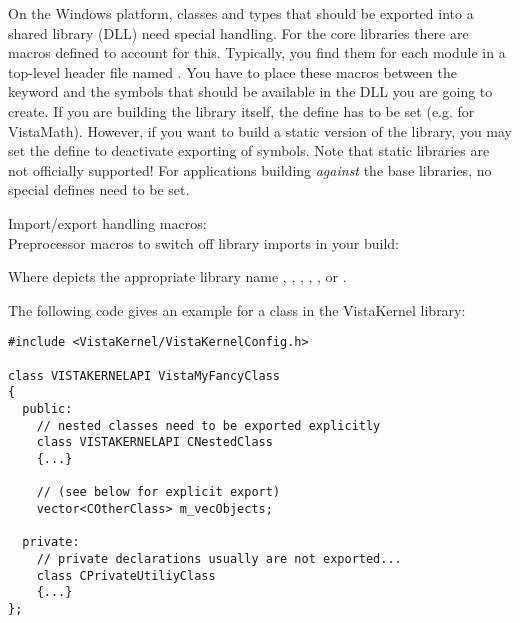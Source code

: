 
On the Windows platform, classes and types that should be exported into a shared library (DLL) need special handling.
For the  core libraries there are macros defined to account for this. 
Typically, you find them for each module in a top-level header file named .
You have to place these macros between the  keyword and the symbols that should be available in the DLL you are going to create.
If you are building the library itself, the define  has to be set (e.g.  for VistaMath). 
However, if you want to build a static version of the library, you may set the define  to deactivate exporting of symbols. Note that static libraries are not officially supported!
For applications building \textit{against} the  base libraries, no special defines need to be set.

Import/export handling macros:  \\
Preprocessor macros to switch off library imports in your build: 

Where \code{[LIB]} depicts the appropriate library name , , , , ,  or .

The following code gives an example for a class in the VistaKernel library:
\begin{verbatim}
#include <VistaKernel/VistaKernelConfig.h>

class VISTAKERNELAPI VistaMyFancyClass
{
  public:
    // nested classes need to be exported explicitly
    class VISTAKERNELAPI CNestedClass
    {...}

    // (see below for explicit export)
    vector<COtherClass> m_vecObjects;
	  
  private:
    // private declarations usually are not exported...
    class CPrivateUtiliyClass
    {...}
};
\end{verbatim}

